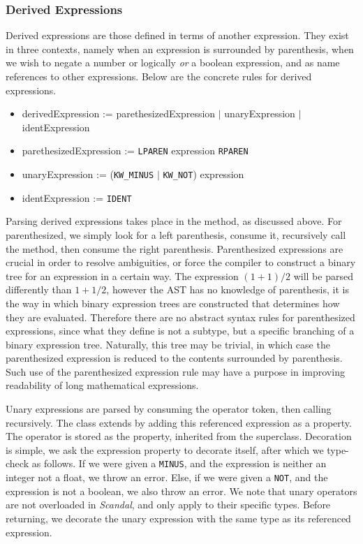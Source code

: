 \subsubsection{Derived Expressions}

Derived expressions are those defined in terms of another expression. They exist in three contexts, namely when an expression is surrounded by parenthesis, when we wish to negate a number or logically \emph{or} a boolean expression, and as name references to other expressions. Below are the concrete rules for derived expressions.

\begin{itemize}
	\item derivedExpression := parethesizedExpression $|$ unaryExpression $|$ identExpression
	\item parethesizedExpression := \texttt{LPAREN} expression \texttt{RPAREN}
	\item unaryExpression := (\texttt{KW\_MINUS} $|$ \texttt{KW\_NOT}) expression
	\item identExpression := \texttt{IDENT}
\end{itemize}

Parsing derived expressions takes place in the  method, as discussed above. For parenthesized, we simply look for a left parenthesis, consume it, recursively call the  method, then consume the right parenthesis. Parenthesized expressions are crucial in order to resolve ambiguities, or force the compiler to construct a binary tree for an expression in a certain way. The expression $(1 + 1) / 2$ will be parsed differently than $1 + 1 / 2$, however the AST has no knowledge of parenthesis, it is the way in which binary expression trees are constructed that determines how they are evaluated. Therefore there are no abstract syntax rules for parenthesized expressions, since what they define is not a subtype, but a specific branching of a binary expression tree. Naturally, this tree may be trivial, in which case the parenthesized expression is reduced to the contents surrounded by parenthesis. Such use of the parenthesized expression rule may have a purpose in improving readability of long mathematical expressions.

Unary expressions are parsed by consuming the operator token, then calling  recursively. The  class extends  by adding this referenced expression as a property. The operator is stored as the  property, inherited from the superclass. Decoration is simple, we ask the expression property to decorate itself, after which we type-check as follows. If we were given a \texttt{MINUS}, and the expression is neither an integer not a float, we throw an error. Else, if we were given a \texttt{NOT}, and the expression is not a boolean, we also throw an error. We note that unary operators are not overloaded in \emph{Scandal}, and only apply to their specific types. Before returning, we decorate the unary expression with the same type as its referenced expression.

